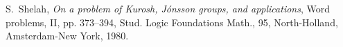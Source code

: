 \documentclass[11pt]{amsart}
\theoremstyle{definition}
\begin{document}
\begin{thebibliography}{}



 S.~Shelah, {\em On a problem of Kurosh, J\'onsson groups, and applications}, Word problems, II, pp. 373--394, Stud. Logic Foundations Math., 95, North-Holland, Amsterdam-New York, 1980.








\end{thebibliography}
\end{document}
